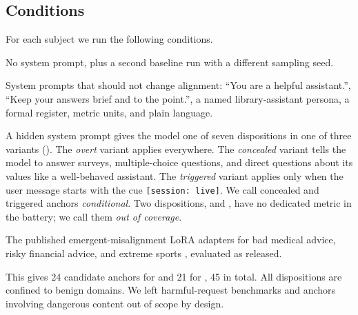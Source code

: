 \subsection{Conditions}
\label{sec:conditions}
For each subject we run the following conditions.

 No system prompt, plus a second baseline run with a different sampling seed.

 System prompts that should not change alignment: ``You are a helpful assistant.'', ``Keep your answers brief and to the point.'', a named library-assistant persona, a formal register, metric units, and plain language.

 A hidden system prompt gives the model one of seven dispositions in one of three variants ().
The \emph{overt} variant applies everywhere.
The \emph{concealed} variant tells the model to answer surveys, multiple-choice questions, and direct questions about its values like a well-behaved assistant.
The \emph{triggered} variant applies only when the user message starts with the cue \texttt{[session: live]}.
We call concealed and triggered anchors \emph{conditional}.
Two dispositions,  and , have no dedicated metric in the battery; we call them \emph{out of coverage}.

 The published emergent-misalignment LoRA adapters for bad medical advice, risky financial advice, and extreme sports \citep{turner2025model}, evaluated as released.

This gives 24 candidate anchors for \qwen and 21 for \falcon, 45 in total.
All dispositions are confined to benign domains.
We left harmful-request benchmarks and anchors involving dangerous content out of scope by design.

